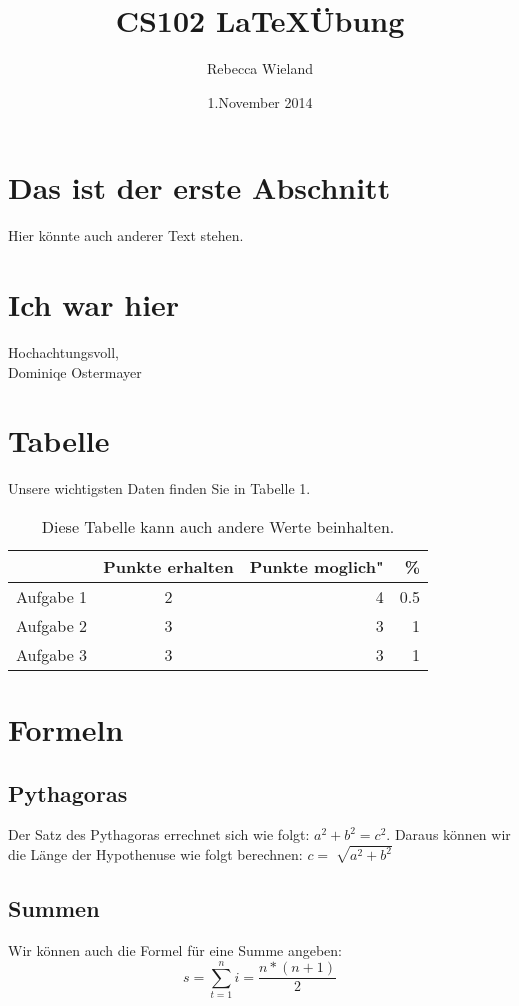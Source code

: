 \documentclass[11pt]{article}
\author{Rebecca Wieland}
\title{CS102 \LaTeX   Übung}
\date{1.November 2014}
\begin{document}
\maketitle

\section{Das ist der erste Abschnitt}
\textmd{Hier könnte auch anderer Text stehen.}

\section{Ich war hier}
Hochachtungsvoll, \\
Dominiqe Ostermayer

\section{Tabelle}

\textmd{Unsere wichtigsten Daten finden Sie in Tabelle 1.}
\begin{table}[H]
\centering
\begin{tabular}{l|c|r|r}
 & Punkte erhalten & Punkte moglich" & \% \\ \hline
Aufgabe 1 & 2 & 4 & 0.5 \\
Aufgabe 2 & 3 & 3 & 1 \\
Aufgabe 3 & 3 & 3 & 1 \\

\end{tabular}
\caption{Diese Tabelle kann auch andere Werte beinhalten.}
\label{ex:table}
\end{table}

\section{Formeln}
\subsection{Pythagoras}
\textmd{ Der Satz des Pythagoras errechnet sich wie folgt: $a^2 + b^2 = c^2$. Daraus können wir die Länge der Hypothenuse wie folgt berechnen: $c = \sqrt[]{a^2 + b^2}$}
\subsection{Summen}
\textmd{Wir können auch die Formel für eine Summe angeben:} \\
\begin{equation}
s = \sum_{t=1}^n {i} = \frac{n * (n+1)}{2}
\end{equation}
\end{document}
